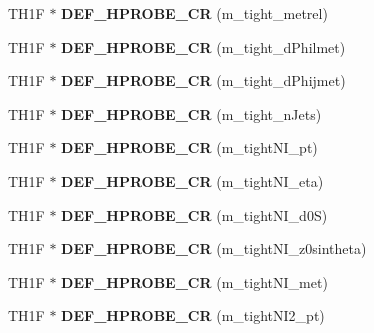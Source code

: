 \begin{DoxyCompactItemize}
\item 
\hypertarget{classHistos__Fake_a1d1c815e169fdddbb44e508dc22055bf}{
TH1F $\ast$ {\bfseries DEF\_\-HPROBE\_\-CR} (m\_\-tight\_\-metrel)}
\label{classHistos__Fake_a1d1c815e169fdddbb44e508dc22055bf}

\item 
\hypertarget{classHistos__Fake_a3bd54c6096c50a1d9bc2ab5474e9a44c}{
TH1F $\ast$ {\bfseries DEF\_\-HPROBE\_\-CR} (m\_\-tight\_\-dPhilmet)}
\label{classHistos__Fake_a3bd54c6096c50a1d9bc2ab5474e9a44c}

\item 
\hypertarget{classHistos__Fake_a9d836f06c0cf84ab6f70952ca0603a39}{
TH1F $\ast$ {\bfseries DEF\_\-HPROBE\_\-CR} (m\_\-tight\_\-dPhijmet)}
\label{classHistos__Fake_a9d836f06c0cf84ab6f70952ca0603a39}

\item 
\hypertarget{classHistos__Fake_a8e9c6568a34d962958cfd5382eb24044}{
TH1F $\ast$ {\bfseries DEF\_\-HPROBE\_\-CR} (m\_\-tight\_\-nJets)}
\label{classHistos__Fake_a8e9c6568a34d962958cfd5382eb24044}

\item 
\hypertarget{classHistos__Fake_a06b0c0463799d0c11fc5a81bac10cae9}{
TH1F $\ast$ {\bfseries DEF\_\-HPROBE\_\-CR} (m\_\-tightNI\_\-pt)}
\label{classHistos__Fake_a06b0c0463799d0c11fc5a81bac10cae9}

\item 
\hypertarget{classHistos__Fake_ae15efd0bd131d65f07b2bc454b2db518}{
TH1F $\ast$ {\bfseries DEF\_\-HPROBE\_\-CR} (m\_\-tightNI\_\-eta)}
\label{classHistos__Fake_ae15efd0bd131d65f07b2bc454b2db518}

\item 
\hypertarget{classHistos__Fake_a6cdae049fea38a939e209d5c6d386018}{
TH1F $\ast$ {\bfseries DEF\_\-HPROBE\_\-CR} (m\_\-tightNI\_\-d0S)}
\label{classHistos__Fake_a6cdae049fea38a939e209d5c6d386018}

\item 
\hypertarget{classHistos__Fake_a36b7d28bce9cc14768696c90f579d130}{
TH1F $\ast$ {\bfseries DEF\_\-HPROBE\_\-CR} (m\_\-tightNI\_\-z0sintheta)}
\label{classHistos__Fake_a36b7d28bce9cc14768696c90f579d130}

\item 
\hypertarget{classHistos__Fake_adaa1f993e077fe40e7a7f262135fbb62}{
TH1F $\ast$ {\bfseries DEF\_\-HPROBE\_\-CR} (m\_\-tightNI\_\-met)}
\label{classHistos__Fake_adaa1f993e077fe40e7a7f262135fbb62}

\item 
\hypertarget{classHistos__Fake_a308244225f576f78a03337501c787078}{
TH1F $\ast$ {\bfseries DEF\_\-HPROBE\_\-CR} (m\_\-tightNI2\_\-pt)}
\label{classHistos__Fake_a308244225f576f78a03337501c787078}


\end{DoxyCompactItemize}
